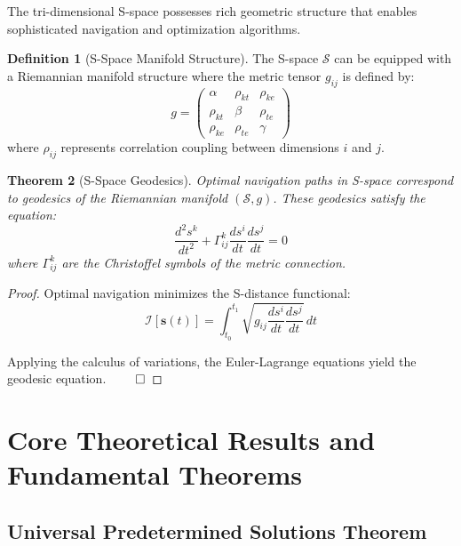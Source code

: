 \documentclass[11pt]{article}
\newtheorem{theorem}{Theorem}[section]
\theoremstyle{definition}
\newtheorem{definition}[theorem]{Definition}
\theoremstyle{remark}
\newcommand{\SEntropy}{\mathcal{S}}
\begin{document}
The tri-dimensional S-space possesses rich geometric structure that enables sophisticated navigation and optimization algorithms.

\begin{definition}[S-Space Manifold Structure]
The S-space $\SEntropy$ can be equipped with a Riemannian manifold structure where the metric tensor $g_{ij}$ is defined by:
\begin{equation}
g = \begin{pmatrix}
\alpha & \rho_{kt} & \rho_{ke} \\
\rho_{kt} & \beta & \rho_{te} \\
\rho_{ke} & \rho_{te} & \gamma
\end{pmatrix}
\end{equation}
where $\rho_{ij}$ represents correlation coupling between dimensions $i$ and $j$.
\end{definition}

\begin{theorem}[S-Space Geodesics]
\label{thm:geodesics}
Optimal navigation paths in S-space correspond to geodesics of the Riemannian manifold $(\SEntropy, g)$. These geodesics satisfy the equation:
\begin{equation}
\frac{d^2 s^k}{dt^2} + \Gamma^k_{ij} \frac{ds^i}{dt} \frac{ds^j}{dt} = 0
\end{equation}
where $\Gamma^k_{ij}$ are the Christoffel symbols of the metric connection.
\end{theorem}

\begin{proof}
Optimal navigation minimizes the S-distance functional:
\begin{equation}
\mathcal{I}[\mathbf{s}(t)] = \int_{t_0}^{t_1} \sqrt{g_{ij} \frac{ds^i}{dt} \frac{ds^j}{dt}} \, dt
\end{equation}

Applying the calculus of variations, the Euler-Lagrange equations yield the geodesic equation. $\qed$
\end{proof}

\section{Core Theoretical Results and Fundamental Theorems}

\subsection{Universal Predetermined Solutions Theorem}
\end{document}
